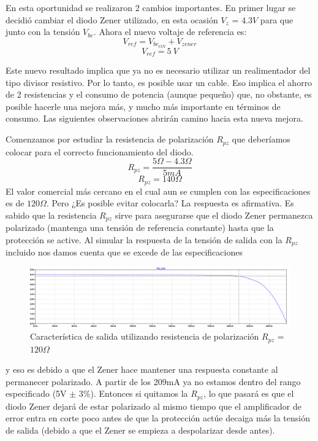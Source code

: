 En esta oportunidad se realizaron 2 cambios importantes. En primer lugar se decidió cambiar el diodo Zener utilizado, en esta ocasión $V_z$ = $4.3V$ para que junto con la tensión $V_{be}$.
Ahora el nuevo voltaje de referencia es:
\begin{equation}
	V_{ref} = V_{be_{ON}} + V_{zener}
\end{equation}
\begin{equation}
	V_{ref} = 5\ V
\end{equation}

Este nuevo resultado implica que ya no es necesario utilizar un realimentador del tipo divisor resistivo. Por lo tanto, es posible usar un cable. Eso implica el ahorro de 2 resistencias y el consumo de potencia (aunque pequeño) que, no obstante, es posible hacerle una mejora más, y mucho más importante en términos de consumo. Las siguientes observaciones abrirán camino hacia esta nueva mejora.

Comenzamos por estudiar la resistencia de polarización $R_{pz}$ que deberíamos colocar para el correcto funcionamiento del diodo.
\begin{equation}
	R_{pz} = \frac{5\Omega-4.3\Omega}{5mA}
\end{equation}
\begin{equation}
R_{pz} = 140 \Omega
\end{equation}
El valor comercial más cercano en el cual aun se cumplen con las especificaciones es de $120\Omega$.
Pero ¿Es posible evitar colocarla? La respuesta es afirmativa.
Es sabido que la resistencia $R_{pz}$ sirve para asegurarse que el diodo Zener
permanezca polarizado (mantenga una tensión de referencia constante) hasta 
que la protección se active. Al simular la respuesta de la tensión de 
salida con la $R_{pz}$ incluido nos damos cuenta que se excede de las especificaciones 
\begin{figure}[H]
	\centering
	\includegraphics[width=\linewidth]{ImagenesEjercicio1/ConRpz}
	\caption{Característica de salida utilizando resistencia de polarización $R_{pz}$ = $120\Omega$}
	\label{fig:conrpz}
\end{figure}

 y eso es debido a que el Zener hace mantener una respuesta constante
al permanecer polarizado. A partir de los 209mA ya no estamos dentro del rango especificado
(5V $\pm$ 3\%). Entonces si quitamos la $R_{pz}$, lo que pasará es que el diodo Zener dejará de estar polarizado
al mismo tiempo que el amplificador de error entra en corte poco antes de que la protección actúe
decaiga más la tensión de salida (debido a que el Zener se empieza a despolarizar desde antes).

